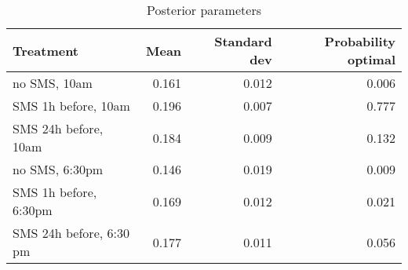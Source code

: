 \begin{table}[ht]
\centering
\caption{Posterior parameters} 
\label{tab:posterior}
\begin{tabular}{lrrr}
  \hline
Treatment & Mean & Standard dev & Probability optimal \\ 
  \hline
no SMS, 10am & 0.161 & 0.012 & 0.006 \\ 
  SMS 1h before, 10am & 0.196 & 0.007 & 0.777 \\ 
  SMS 24h before, 10am & 0.184 & 0.009 & 0.132 \\ 
  no SMS, 6:30pm & 0.146 & 0.019 & 0.009 \\ 
  SMS 1h before, 6:30pm & 0.169 & 0.012 & 0.021 \\ 
  SMS 24h before, 6:30 pm & 0.177 & 0.011 & 0.056 \\ 
   \hline
\end{tabular}
\end{table}
